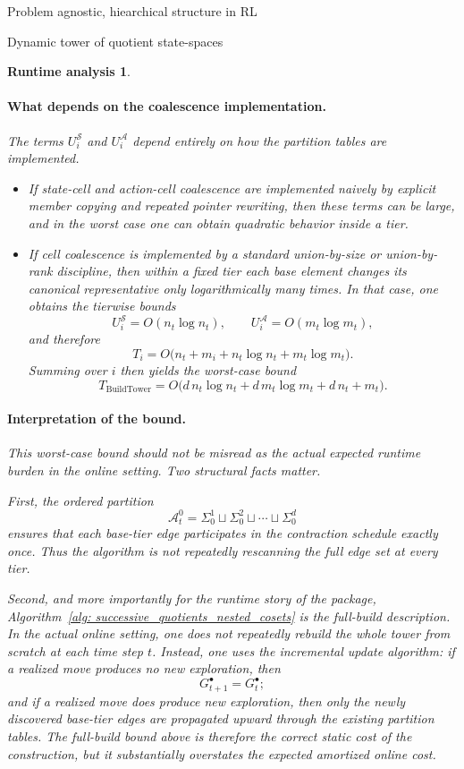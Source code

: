 \documentclass[11pt]{article}
\newtheorem{run_analysis}[subsubsection]{Runtime analysis}
\begin{document}
\begin{section}{Problem agnostic, hiearchical structure in RL}
\begin{subsection}{Dynamic tower of quotient state-spaces}
\begin{run_analysis}
\paragraph{What depends on the coalescence implementation.}
The terms $
U_i^{\mathcal S}$ and 
$U_i^{\mathcal A}$ depend entirely on how the partition tables are implemented.

\begin{itemize}
    \item If state-cell and action-cell coalescence are implemented naively by explicit member copying and repeated pointer rewriting, then these terms can be large, and in the worst case one can obtain quadratic behavior inside a tier.

    \item If cell coalescence is implemented by a standard union-by-size or union-by-rank discipline, then within a fixed tier each base element changes its canonical representative only logarithmically many times. In that case, one obtains the tierwise bounds
    \[
    U_i^{\mathcal S}=O(n_t\log n_t),
    \qquad
    U_i^{\mathcal A}=O(m_t\log m_t),
    \]
    and therefore
    \[
    T_i
    =
    O\bigl(n_t + m_i + n_t\log n_t + m_t\log m_t\bigr).
    \]
    Summing over $i$ then yields the worst-case bound
    \[
    T_{\mathrm{BuildTower}}
    =
    O\bigl(
    d\,n_t\log n_t + d\,m_t\log m_t + d\,n_t + m_t
    \bigr).
    \]
\end{itemize}

\paragraph{Interpretation of the bound.}
This worst-case bound should not be misread as the actual expected runtime burden in the online setting. Two structural facts matter.

First, the ordered partition
\[
\mathcal{A}_t^0
=
\Sigma_0^1 \sqcup \Sigma_0^2 \sqcup \cdots \sqcup \Sigma_0^d
\]
ensures that each base-tier edge participates in the contraction schedule exactly once. Thus the algorithm is not repeatedly rescanning the full edge set at every tier.

Second, and more importantly for the runtime story of the package, Algorithm~\ref{alg: successive_quotients_nested_cosets} is the \emph{full-build} description. In the actual online setting, one does not repeatedly rebuild the whole tower from scratch at each time step $t$. Instead, one uses the incremental update algorithm: if a realized move produces no new exploration, then
\[
G_{t+1}^\bullet = G_t^\bullet;
\]
and if a realized move does produce new exploration, then only the newly discovered base-tier edges are propagated upward through the existing partition tables. The full-build bound above is therefore the correct static cost of the construction, but it substantially overstates the expected amortized online cost.


\end{run_analysis}
\end{subsection}
\end{section}
\end{document}
